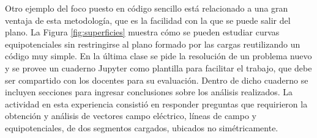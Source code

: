 Otro ejemplo del foco puesto en código sencillo está relacionado a una gran ventaja de esta metodología, que es la facilidad con la que se puede salir del plano. La Figura \ref{fig:superficies} muestra cómo se pueden estudiar curvas equipotenciales sin restringirse al plano formado por las cargas reutilizando un código muy simple. En la última clase se pide la resolución de un problema nuevo y se provee un cuaderno Jupyter como plantilla para facilitar el trabajo, que debe ser compartido con los docentes para su evaluación. Dentro de dicho cuaderno se incluyen secciones para ingresar conclusiones sobre los análisis realizados. La actividad en esta experiencia consistió en responder preguntas que requirieron la obtención y análisis de vectores campo eléctrico, líneas de campo y equipotenciales, de dos segmentos cargados, ubicados no simétricamente.